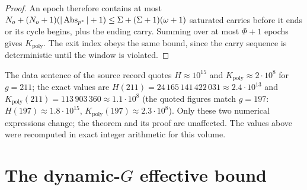 \begin{proof}
An epoch therefore contains at most \(N_o+(N_o+1)(|\operatorname{Abs}_{p^\ast}|+1)\le\Sigma+(\Sigma+1)(\omega+1)\) saturated carries before it ends or its cycle begins, plus the ending carry. Summing over at most \(\Phi+1\) epochs gives \(K_{\mathrm{poly}}\). The exit index obeys the same bound, since the carry sequence is deterministic until the window is violated.
\end{proof}

\begin{remark}\label{rem:E71}
The data sentence of the source record quotes \(H\approx10^{15}\) and \(K_{\mathrm{poly}}\approx2\cdot10^8\) for \(g=211\); the exact values are \(H(211)=24\,165\,141\,422\,031\approx2.4\cdot10^{13}\) and \(K_{\mathrm{poly}}(211)=113\,903\,360\approx1.1\cdot10^8\) (the quoted figures match \(g=197\): \(H(197)\approx1.8\cdot10^{15}\), \(K_{\mathrm{poly}}(197)\approx2.3\cdot10^8\)). Only these two numerical expressions change; the theorem and its proof are unaffected. The values above were recomputed in exact integer arithmetic for this volume.
\end{remark}

\section{\texorpdfstring{The dynamic-\(G\) effective bound}{The dynamic-G effective bound}}

